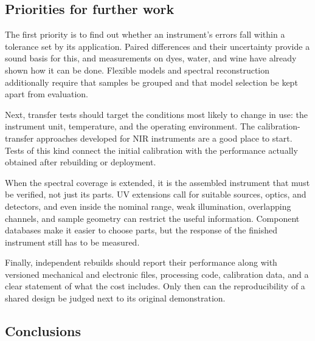\subsection{Priorities for further work}

The first priority is to find out whether an instrument's errors fall within a tolerance set by its application. Paired differences and their uncertainty\citep{bland1986statistical} provide a sound basis for this, and measurements on dyes, water, and wine have already shown how it can be done.\citep{clippard2016construction,cirrone2025low,bulusu2024technical,tonelli2025portable} Flexible models and spectral reconstruction additionally require that samples be grouped and that model selection be kept apart from evaluation.\citep{varma2006bias,lopin2025evaluation,moralesguerra2026low,krause2021smartspectrometer}

Next, transfer tests should target the conditions most likely to change in use: the instrument unit,\citep{stevens2024low,troscianko2023osprad} temperature,\citep{wilkes2019pispec,markvart2020continuous} and the operating environment.\citep{klueppel2026environmental} The calibration-transfer approaches developed for NIR instruments are a good place to start.\citep{bec2022miniaturized,krause2021smartspectrometer} Tests of this kind connect the initial calibration with the performance actually obtained after rebuilding or deployment.

When the spectral coverage is extended, it is the assembled instrument that must be verified, not just its parts. UV extensions call for suitable sources, optics, and detectors,\citep{khan2019gas,booysen2021water,fernandes2024development} and even inside the nominal range, weak illumination,\citep{laganovska2020portable,vidal2021use} overlapping channels, and sample geometry\citep{lopin2025evaluation,besozzi2026flexible,dolgalev2025development} can restrict the useful information. Component databases make it easier to choose parts,\citep{coppola2024i} but the response of the finished instrument still has to be measured.

Finally, independent rebuilds should report their performance along with versioned mechanical and electronic files, processing code, calibration data, and a clear statement of what the cost includes. Only then can the reproducibility of a shared design be judged next to its original demonstration.

\subsection{Conclusions}

